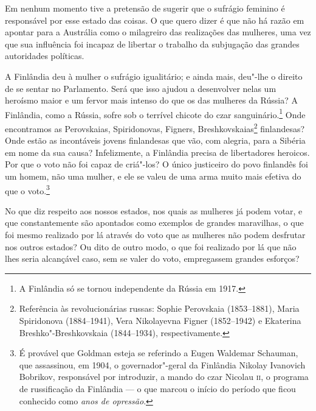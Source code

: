 Em nenhum momento tive a pretensão de sugerir que o sufrágio feminino é
responsável por esse estado das coisas. O que quero dizer é que não há
razão em apontar para a Austrália como o milagreiro das realizações das
mulheres, uma vez que sua influência foi incapaz de libertar o
trabalho da subjugação das grandes autoridades políticas.

A Finlândia deu à mulher o sufrágio igualitário; e ainda mais, deu"-lhe o
direito de se sentar no Parlamento. Será que isso ajudou a desenvolver
nelas um heroísmo maior e um fervor mais intenso do que os das
mulheres da Rússia? A Finlândia, como a Rússia, sofre sob o terrível
chicote do czar sanguinário.\footnote{A Finlândia só se tornou
  independente da Rússia em 1917.} Onde encontramos as Perovskaias,
Spiridonovas, Figners, Breshkovskaias\footnote{Referência
  às revolucionárias russas: Sophie Perovskaia (1853--1881), Maria
  Spiridonova (1884--1941), Vera Nikolayevna Figner (1852--1942)
  e Ekaterina Breshko"-Breshkovskaia (1844--1934), respectivamente.
  }
finlandesas? Onde estão as incontáveis jovens finlandesas que vão, com
alegria, para a Sibéria em nome da sua causa? Infelizmente, a
Finlândia precisa de libertadores heroicos. Por que o voto não foi capaz
de criá"-los? O único justiceiro do povo finlandês foi um homem, não uma
mulher, e ele se valeu de uma arma muito mais efetiva do que o
voto.\footnote{É provável que Goldman esteja se referindo a Eugen
  Waldemar Schauman, que assassinou, em 1904, o governador"-geral da
  Finlândia Nikolay Ivanovich Bobrikov, responsável por introduzir, a
  mando do czar Nicolau \textsc{ii}, o programa de russificação da Finlândia --- o
  que marcou o início do período que ficou conhecido como \textit{anos de
  opressão}.}

No que diz respeito aos nossos estados, nos quais as mulheres já podem votar, e
que constantemente são apontados como exemplos de grandes maravilhas, o
que foi mesmo realizado por lá através do voto que as mulheres não podem
desfrutar nos outros estados? Ou dito de outro modo, o que foi realizado
por lá que não lhes seria alcançável caso, sem se valer do
voto, empregassem grandes esforços?

